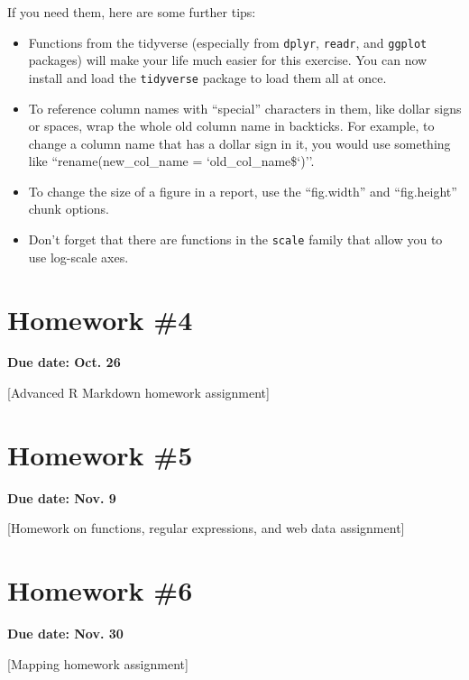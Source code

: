 \documentclass[]{book}
\providecommand{\tightlist}{%
  \setlength{\itemsep}{0pt}\setlength{\parskip}{0pt}}
\begin{document}
If you need them, here are some further tips:

\begin{itemize}
\tightlist
\item
  Functions from the tidyverse (especially from \texttt{dplyr},
  \texttt{readr}, and \texttt{ggplot} packages) will make your life much
  easier for this exercise. You can now install and load the
  \texttt{tidyverse} package to load them all at once.
\item
  To reference column names with ``special'' characters in them, like
  dollar signs or spaces, wrap the whole old column name in backticks.
  For example, to change a column name that has a dollar sign in it, you
  would use something like ``rename(new\_col\_name =
  `old\_col\_name\$`)''.
\item
  To change the size of a figure in a report, use the ``fig.width'' and
  ``fig.height'' chunk options.
\item
  Don't forget that there are functions in the \texttt{scale} family
  that allow you to use log-scale axes.
\end{itemize}

\section{Homework \#4}\label{homework-4}

\textbf{Due date: Oct. 26}

{[}Advanced R Markdown homework assignment{]}

\section{Homework \#5}\label{homework-5}

\textbf{Due date: Nov. 9}

{[}Homework on functions, regular expressions, and web data
assignment{]}

\section{Homework \#6}\label{homework-6}

\textbf{Due date: Nov. 30}

{[}Mapping homework assignment{]}



\backmatter
\printindex
\end{document}

